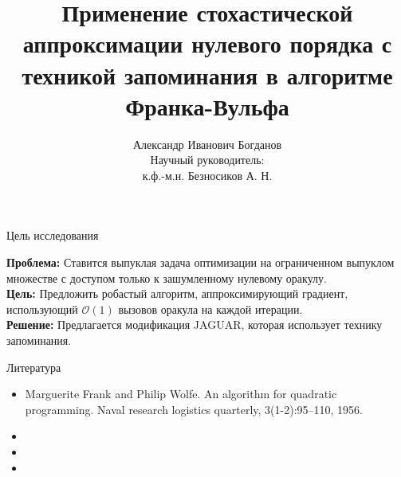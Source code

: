 \documentclass{beamer}
\title[\hbox to 56mm{Применение стохастической аппроксимации нулевого порядка с техникой запоминания в алгоритме Франка-Вульфа}]{Применение стохастической аппроксимации нулевого порядка с техникой запоминания в алгоритме Франка-Вульфа}
\author[А. Б. Богданов]{Александр Иванович Богданов \\
                        $ $ \\ 
                        Научный руководитель: \\
                        к.ф.-м.н. Безносиков А. Н.}
\institute[]{Московский физико-технический институт \\
             ФПМИ \\
             Кафедра <<Интеллектуальные системы>>}
\date{}
\begin{document}

\begin{frame}

    \maketitle

\end{frame}


\begin{frame}{Цель исследования}

    \textbf{Проблема:} Ставится выпуклая задача оптимизации на ограниченном выпуклом множестве с доступом только к зашумленному нулевому оракулу. \\

    $ $\\

    \textbf{Цель:} Предложить робастый алгоритм, аппроксимирующий градиент, использующий $\mathcal{O}(1)$ вызовов оракула на каждой итерации.\\

    $ $\\

    \textbf{Решение:} Предлагается модификация JAGUAR, которая использует технику запоминания.
    
\end{frame}


\begin{frame}{Литература}
    \begin{itemize}
        \item Marguerite Frank and Philip Wolfe. An algorithm for quadratic programming. Naval research logistics quarterly, 3(1-2):95–110, 1956.
        \item   
        \item
        \item 
    \end{itemize}

\end{frame}

\end{document}
